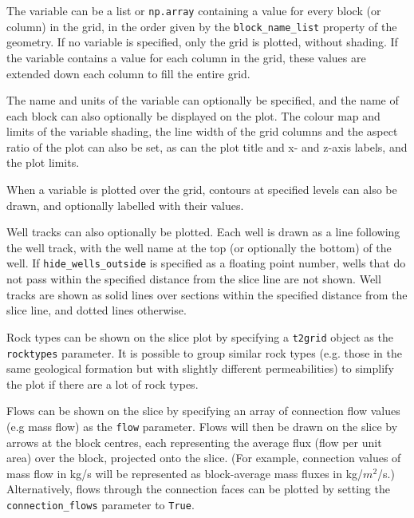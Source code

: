 The variable can be a list or \texttt{np.array} containing a value for every block (or column) in the grid, in the order given by the \texttt{block\_name\_list} property of the geometry.  If no variable is specified, only the grid is plotted, without shading.  If the variable contains a value for each column in the grid, these values are extended down each column to fill the entire grid.

The name and units of the variable can optionally be specified, and the name of each block can also optionally be displayed on the plot.  The colour map and limits of the variable shading, the line width of the grid columns and the aspect ratio of the plot can also be set, as can the plot title and x- and z-axis labels, and the plot limits.

When a variable is plotted over the grid, contours at specified levels can also be drawn, and optionally labelled with their values.

Well tracks can also optionally be plotted.  Each well is drawn as a line following the well track, with the well name at the top (or optionally the bottom) of the well.  If \texttt{hide\_wells\_outside} is specified as a floating point number, wells that do not pass within the specified distance from the slice line are not shown.  Well tracks are shown as solid lines over sections within the specified distance from the slice line, and dotted lines otherwise.

Rock types can be shown on the slice plot by specifying a \texttt{t2grid} object as the \texttt{rocktypes} parameter.  It is possible to group similar rock types (e.g. those in the same geological formation but with slightly different permeabilities) to simplify the plot if there are a lot of rock types.

Flows can be shown on the slice by specifying an array of connection flow values (e.g mass flow) as the \texttt{flow} parameter.  Flows will then be drawn on the slice by arrows at the block centres, each representing the average flux (flow per unit area) over the block, projected onto the slice.  (For example, connection values of mass flow in kg/s will be represented as block-average mass fluxes in kg/$m^2$/s.)  Alternatively, flows through the connection faces can be plotted by setting the \texttt{connection\_flows} parameter to \texttt{True}.

